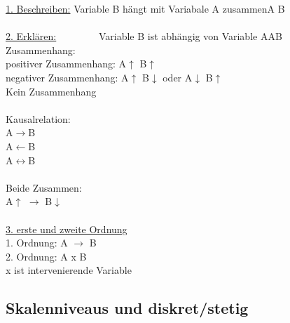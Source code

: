 \underline{1. Beschreiben:} Variable B hängt mit Variabale A zusammen\hspace{1cm}A \textemdash{} B\\\\
\underline{2. Erklären:}~~~~~~~~ Variable B ist abhängig von Variable A\hspace{2cm}A\textrightarrow B\\
Zusammenhang:\\
positiver Zusammenhang: A$\uparrow$ B$\uparrow$\\
negativer Zusammenhang: A$\uparrow$ B$\downarrow$ oder A$\downarrow$ B$\uparrow$\\ Kein Zusammenhang\\
\\ Kausalrelation:\\
A$\longrightarrow$B\\
A$\longleftarrow$B\\
A$\longleftrightarrow$B\\
\\Beide Zusammen:\\
A$\uparrow$ $\longrightarrow$ B$\downarrow$\\\\
\underline{3. erste und zweite Ordnung}\\
1. Ordnung: A $\longrightarrow$ B\\
2. Ordnung: A \textrightarrow x \textrightarrow B\\
x ist intervenierende Variable

\subsection{Skalenniveaus und diskret/stetig}


